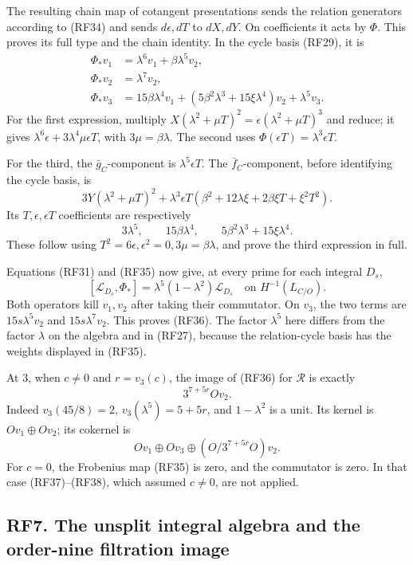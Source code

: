 \documentclass[
  10pt,
]{article}
\begin{document}
The resulting chain map of cotangent presentations sends the relation
generators according to (RF34) and sends \(d\epsilon,dT\) to \(dX,dY\).
On coefficients it acts by \(\Phi\). This proves its full type and the
chain identity. In the cycle basis (RF29), it is \[
\begin{aligned}
\Phi_*v_1&=\lambda^6v_1+\beta\lambda^5v_2,\\
\Phi_*v_2&=\lambda^7v_2,\\
\Phi_*v_3&=15\beta\lambda^4v_1
+(5\beta^2\lambda^3+15\xi\lambda^4)v_2+\lambda^5v_3.
\end{aligned}
\tag{RF35}
\] For the first expression, multiply \(X(\lambda^2+\mu T)^2
=\epsilon(\lambda^2+\mu T)^3\) and reduce; it gives
\(\lambda^6\epsilon+3\lambda^4\mu\epsilon T\), with
\(3\mu=\beta\lambda\). The second uses
\(\Phi(\epsilon T)=\lambda^3\epsilon T\).

For the third, the \(\bar g_C\)-component is \(\lambda^5\epsilon T\).
The \(\bar f_C\)-component, before identifying the cycle basis, is \[
3Y(\lambda^2+\mu T)^2
+\lambda^3\epsilon T
\left(\beta^2+12\lambda\xi+2\beta\xi T+\xi^2T^2\right).
\] Its \(T,\epsilon,\epsilon T\) coefficients are respectively \[
3\lambda^5,\qquad15\beta\lambda^4,\qquad
5\beta^2\lambda^3+15\xi\lambda^4.
\] These follow using \(T^2=6\epsilon,\epsilon^2=0,3\mu=\beta\lambda\),
and prove the third expression in full.

Equations (RF31) and (RF35) now give, at every prime for each integral
\(D_s\), \[
[\mathcal L_{D_s},\Phi_*]
=\lambda^5(1-\lambda^2)\mathcal L_{D_s}
\quad\text{on }H^{-1}(L_{C/O}).
\tag{RF36}
\] Both operators kill \(v_1,v_2\) after taking their commutator. On
\(v_3\), the two terms are \(15s\lambda^5v_2\) and \(15s\lambda^7v_2\).
This proves (RF36). The factor \(\lambda^5\) here differs from the
factor \(\lambda\) on the algebra and in (RF27), because the
relation-cycle basis has the weights displayed in (RF35).

At 3, when \(c\ne0\) and \(r=v_3(c)\), the image of (RF36) for
\(\mathcal R\) is exactly \[
3^{7+5r}Ov_2.
\tag{RF37}
\] Indeed \(v_3(45/8)=2\), \(v_3(\lambda^5)=5+5r\), and \(1-\lambda^2\)
is a unit. Its kernel is \(Ov_1\oplus Ov_2\); its cokernel is \[
Ov_1\oplus Ov_3\oplus(O/3^{7+5r}O)v_2.
\tag{RF38}
\] For \(c=0\), the Frobenius map (RF35) is zero, and the commutator is
zero. In that case (RF37)--(RF38), which assumed \(c\ne0\), are not
applied.

\subsection{RF7. The unsplit integral algebra and the order-nine
filtration
image}\label{rf7.-the-unsplit-integral-algebra-and-the-order-nine-filtration-image}
\end{document}
